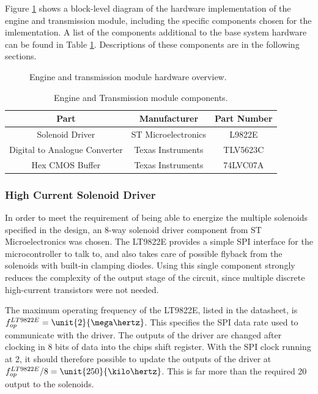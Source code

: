 Figure \ref{fig:engine_system_overview} shows a block-level diagram of the hardware implementation of the engine and transmission module, including the specific components chosen for the imlementation. A list of the components additional to the base system hardware can be found in Table \ref{tab:engine_transmission_module_components}. Descriptions of these components are in the following sections.

\begin{figure}[H]
\centering

\caption{Engine and transmission module hardware overview.}
\label{fig:engine_system_overview}
\end{figure}

\begin{table}
  \caption{Engine and Transmission module components.\label{tab:engine_transmission_module_components}}
  \centering
  \begin{tabular}{|c|c|c|}
    \hline 
    Part & Manufacturer & Part Number\tabularnewline 
    \hline \hline
    Solenoid Driver & ST Microelectronics & L9822E \tabularnewline
    \hline
    Digital to Analogue Converter & Texas Instruments & TLV5623C \tabularnewline
    \hline
    Hex CMOS Buffer & Texas Instruments & 74LVC07A \tabularnewline
    \hline
  \end{tabular}
\end{table}


\subsubsection{High Current Solenoid Driver}

In order to meet the requirement of being able to energize the multiple solenoids specified in the design, an 8-way solenoid driver component from ST Microelectronics was chosen. The LT9822E provides a simple SPI interface for the microcontroller to talk to, and also takes care of possible flyback from the solenoids with built-in clamping diodes. Using this single component strongly reduces the complexity of the output stage of the circuit, since multiple discrete high-current transistors were not needed.

The maximum operating frequency of the LT9822E, listed in the datasheet, is $f_{op}^{LT9822E}=\unit{2}{\mega\hertz}$. This specifies the SPI data rate used to communicate with the driver. The outputs of the driver are changed after clocking in 8 bits of data into the chips shift register. With the SPI clock running at \unit{2}{\mega\hertz}, it should therefore possible to update the outputs of the driver at $f_{op}^{LT9822E}/8=\unit{250}{\kilo\hertz}$. This is far more than the required \unit{20}{\hertz} output to the solenoids.

